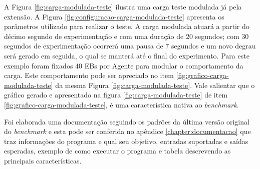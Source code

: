 A Figura \ref{fig:carga-modulada-teste} ilustra uma carga teste modulada já pela extensão. A Figura \ref{fig:configuracao-carga-modulada-teste} apresenta os parâmetros utilizado para realizar o teste. A carga modulada atuará a partir do décimo segundo de experimentação e com uma duração de 20 segundos; com 30 segundos de experimentação ocorrerá uma pausa de 7 segundos e um novo degrau será gerado em seguida, o qual se manterá até o final do experimento. Para este exemplo foram fixados 40 EBs por Agente para modular o comportamento da carga. Este comportamento pode ser apreciado no item \ref{fig:grafico-carga-modulada-teste} da mesma Figura \ref{fig:carga-modulada-teste}. Vale salientar que o gráfico gerado e apresentado na figura \ref{fig:carga-modulada-teste} de item \ref{fig:grafico-carga-modulada-teste}, é uma característica nativa ao \textit{benchmark}.



Foi elaborada uma documentação seguindo os padrões da última versão original do \textit{benchmark} e esta pode ser conferida no apêndice \ref{chapter:documentacao} que traz informações do programa e qual seu objetivo, entradas suportadas e saídas esperadas, exemplo de como executar o programa e tabela descrevendo as principais características.


